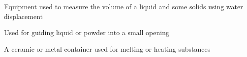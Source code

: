 \begin{definition}
    Equipment used to measure the volume of a liquid and some solids using
    water displacement
\end{definition}

\begin{definition}[Funnel]
    Used for guiding liquid or powder into a small opening
\end{definition}

\begin{definition}[Crucible]
    A ceramic or metal container used for melting or heating substances
\end{definition}

\newpage
